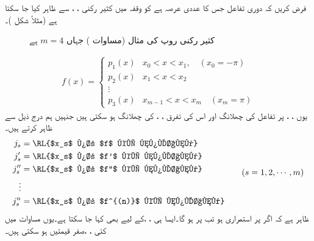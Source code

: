 فرض کریں کہ دوری تفاعل  جس کا عددی عرصہ  ہے کو وقفہ  میں کثیر رکنی ، ،  سے ظاہر کیا جا سکتا ہے (مثلاً شکل )۔
\begin{figure}
\centering
{}
\caption{کثیر رکنی روپ کی مثال (مساوات ) جہاں $m=4$ ہے}
\label{شکل_فوریئر_کثیر_رکنی_روپ}
\end{figure}
%
\begin{align}\label{مساوات_فوریئر_کثیر_رکنی_روپ_الف}
f(x)=
\begin{cases}
p_1(x)&x_0<x<x_1,\quad (x_0=-\pi)\\
p_2(x)& x_1<x<x_2\\
\vdots&\\
p_3(x)& x_{m-1}<x<x_m \quad (x_m=\pi)
\end{cases}
\end{align}
یوں ، ،  پر تفاعل  کی چھلانگ اور اس کی تفرق ، ،   کی چھلانگ ہو سکتی ہیں جنہیں ہم درج ذیل سے ظاہر کرتے ہیں۔
\begin{gather}
\begin{aligned}\label{مساوات_فوریئر_چھلانگ_الف}
j_s&=\text{\RL{$x_s$ پر $f$ کی چھلانگ}}\\
j'_s&=\text{\RL{$x_s$ پر $f'$ کی چھلانگ}}\\
j''_s&=\text{\RL{$x_s$ پر $f''$ کی چھلانگ}}\\
\vdots\\
j^{n}_s&=\text{\RL{$x_s$ پر $f^{(n)}$ کی چھلانگ}}\\
\end{aligned}
\quad \quad (s=1,2,\cdots,m)
\end{gather}
ظاہر ہے کہ اگر  پر  استمراری ہو تب  پر  ہو گا۔ایسا ہی ، ،  کے لیے بھی کہا جا سکتا ہے۔یوں مساوات  میں کئی ، ، صفر قیمتیں ہو سکتی ہیں۔

